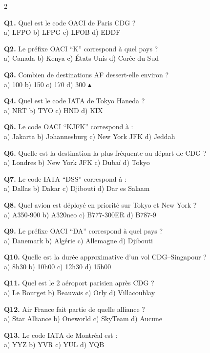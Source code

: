 \documentclass[9pt,a4paper,landscape]{article}
\newcommand{\CORR}{\textcolor{afred}{$\blacktriangle$}}
\begin{document}
\begin{multicols}{2}
\scriptsize

\textbf{Q1.} Quel est le code OACI de Paris CDG ?\\
a) LFPO \quad b) LFPG \quad c) LFOB \quad d) EDDF

\textbf{Q2.} Le préfixe OACI ``K'' correspond à quel pays ?\\
a) Canada \quad b) Kenya \quad c) États-Unis \quad d) Corée du Sud

\textbf{Q3.} Combien de destinations AF dessert-elle environ ?\\
a) 100 \quad b) 150 \quad c) 170 \quad d) 300 \CORR

\textbf{Q4.} Quel est le code IATA de Tokyo Haneda ?\\
a) NRT \quad b) TYO \quad c) HND \quad d) KIX

\textbf{Q5.} Le code OACI ``KJFK'' correspond à :  \\
a) Jakarta \quad b) Johannesburg \quad c) New York JFK \quad d) Jeddah

\textbf{Q6.} Quelle est la destination la plus fréquente au départ de CDG ?\\
a) Londres \quad b) New York JFK \quad c) Dubaï \quad d) Tokyo

\textbf{Q7.} Le code IATA ``DSS'' correspond à :  \\
a) Dallas \quad b) Dakar \quad c) Djibouti \quad d) Dar es Salaam

\textbf{Q8.} Quel avion est déployé en priorité sur Tokyo et New York ?\\
a) A350-900 \quad b) A320neo \quad c) B777-300ER \quad d) B787-9

\textbf{Q9.} Le préfixe OACI ``DA'' correspond à quel pays ?\\
a) Danemark \quad b) Algérie \quad c) Allemagne \quad d) Djibouti

\textbf{Q10.} Quelle est la durée approximative d'un vol CDG--Singapour ?\\
a) 8h30 \quad b) 10h00 \quad c) 12h30 \quad d) 15h00

\textbf{Q11.} Quel est le 2 aéroport parisien après CDG ?\\
a) Le Bourget \quad b) Beauvais \quad c) Orly \quad d) Villacoublay

\textbf{Q12.} Air France fait partie de quelle alliance ?\\
a) Star Alliance \quad b) Oneworld \quad c) SkyTeam \quad d) Aucune

\textbf{Q13.} Le code IATA de Montréal est :  \\
a) YYZ \quad b) YVR \quad c) YUL \quad d) YQB


\end{multicols}
\end{document}
